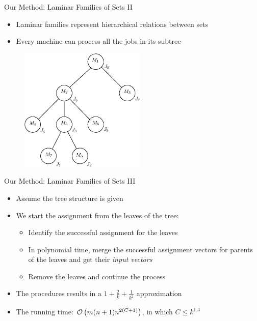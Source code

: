 \documentclass[10pt]{beamer}
\begin{document}
\begin{frame}{Our Method: Laminar Families of Sets II}
    \begin{itemize}
        \item<1-> Laminar families represent hierarchical relations between sets
        \item<2-> Every machine can process all the jobs in its subtree
    \end{itemize}
    \begin{figure}
        \begin{center}
            \includegraphics[width=6cm]{laminar.eps}
        \end{center}
    \end{figure}
\end{frame}

\begin{frame}{Our Method: Laminar Families of Sets III}
    \begin{itemize}
        \item<1-> Assume the tree structure is given
        \item<2-> We start the assignment from the leaves of the tree:
        \begin{itemize}
            \item<3-> Identify the \alert{successful} assignment for the leaves
            \item<4-> In polynomial time, merge the successful assignment vectors for parents of the leaves and get their \emph{input vectors}
            \item<5-> Remove the leaves and continue the process        
        \end{itemize}
        \item<6-> The procedures results in a $1 + \frac{2}{k} + \frac{1}{k^2}$ approximation
        \item<7-> The running time: $\mathcal{O} \left( m(n+1)n^{2(C + 1)} \right)$, in which $C \leq k ^ {1.4}$
    \end{itemize}
\end{frame}
\end{document}
